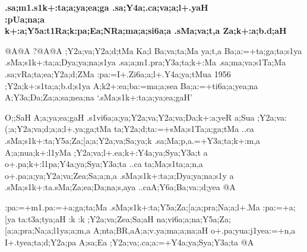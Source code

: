 \vfill

\begin{center}
{\Large\bfseries{\sktf .sa;m1.s1k+:ta;a;ya;ea;ga%
\ZF{-}.sa;Y4a;.ca;va;a;l+.yaH}}\\
{\Large\bfseries{\sktf :pUa;na;a {}}}\\
{\large\bfseries{\sktf k+:a;Y5a:t1Ra;k\ZF{-}:pa;Ea;NRa;ma;a;si6a;a\ZF{,}
.sMa;va;t,a {}\ZF{,} Za;k+:a;b.d;aH {}}}
\end{center}

\newpage

\begin{spacing}{1.15}
{{\sktf {}@A@A ?@A@A ;Y2a;va;Y2a;d;tMa Ka;l
Ba;va;ta;Ma ya;t,a Ba;a:=+ta;ga;ta;s1ya .sMa;s1k+:ta;a;Dya;ya;na;s1ya .sa;a;m1.pra;Y3a;ta;k+:Ma
.sa;ma;va;s1Ta;Ma .sa;vRa;ta;ea;Y2a;d;ZMa :pa:=I+.Zi6a;a;l+.Y4a;ya;tMua 1956 ;Y2a;k+:s1ta;a;b.d;s1ya
A;k2+:ea;ba:=\ZF{-}ma;a;sea Ba;a:=+ti6a;a;yea;na A;Y3a;Da;Za;a;sa;nea;na}
`{\sktf .sMa;s1k+:ta;a;ya;ea;gaH}'}

\vskip 0.1cm

{\sktf O;;SaH A;a;ya;ea;gaH .s1vi6a;a;ya;Y2a;va;Y2a;va;Da;k+:a;yeR%
a;Sua ;Y2a;va:(;a;Y2a;va;d;a;a;l+.ya;ga;tMa
ta;Y2a;d;ta:=+sMa;s1Ta;a;ga;tMa ..ca .sMa;s1k+:ta;Y5a;Za;[a;a;Y2a;va;Sa;ya;k .sa;Ma;p,a.=+Y3a;ta;k+:m,a A;a;nua;k+:l1yMa ;Y2a;va;l+.ea;k+:Y4a;ya;Sya;Y3a;t%
a\ZF{,} o+.pa;k+:l1pa;Y4a;ya;Sya;Y3a;ta ..ca ta;Ma;s1ta;a;n,a
o+.pa;a;ya;Y2a;va;Zea;Sa;a;n,a .sMa;s1k+:ta;a;Dya;ya;na;s1y%
a .sMa;s1k+:ta\ZF{-}.sMa;Za;ea;Da;na;s,aya ..ca\break A;Y6a;Ba;va:;d;yea @A}

\vskip 0.1cm

{\sktf :pa:=+m1.pa:=+a;ga;ta;Ma .sMa;s1k+:ta;Y5a;Za;[a;a;pra;Na;a;l+.Ma :pa:=+a;[ya
ta:t3a;tya;aH :k :k ;Y2a;va;Zea;Sa;aH
na;vi6a;a;na;Y5a;Za;[a;a;pra;Na;a;l1ya;a;m,a A;nta;BR,aA;a;v.ya;ma;a;na;aH o+.pa;yua:j1yea:=+n,a\ZF{,} I+.tyea;ta;d;Y2a;pa
A;sa;Ea ;Y2a;va;.ca;a:=+Y4a;ya;Sya;Y3a;ta @A}


\end{spacing}
